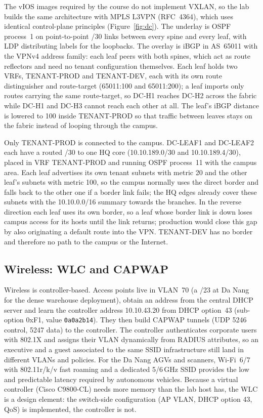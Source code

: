 \documentclass[11pt,a4paper]{article}
\begin{document}
The vIOS images required by the course do not implement VXLAN, so the lab builds the same architecture with MPLS L3VPN (RFC~4364), which uses identical control-plane principles (Figure~\ref{fig:dc}). The underlay is OSPF process~1 on point-to-point /30 links between every spine and every leaf, with LDP distributing labels for the loopbacks. The overlay is iBGP in AS~65011 with the VPNv4 address family: each leaf peers with both spines, which act as route reflectors and need no tenant configuration themselves. Each leaf holds two VRFs, TENANT-PROD and TENANT-DEV, each with its own route distinguisher and route-target (65011:100 and 65011:200); a leaf imports only routes carrying the same route-target, so DC-H1 reaches DC-H2 across the fabric while DC-H1 and DC-H3 cannot reach each other at all. The leaf's iBGP distance is lowered to 100 inside TENANT-PROD so that traffic between leaves stays on the fabric instead of looping through the campus.

Only TENANT-PROD is connected to the campus. DC-LEAF1 and DC-LEAF2 each have a routed /30 to one HQ core (10.10.189.0/30 and 10.10.189.4/30), placed in VRF TENANT-PROD and running OSPF process~11 with the campus area. Each leaf advertises its own tenant subnets with metric 20 and the other leaf's subnets with metric 100, so the campus normally uses the direct border and falls back to the other one if a border link fails; the HQ edges already cover these subnets with the 10.10.0.0/16 summary towards the branches. In the reverse direction each leaf uses its own border, so a leaf whose border link is down loses campus access for its hosts until the link returns; production would close this gap by also originating a default route into the VPN. TENANT-DEV has no border and therefore no path to the campus or the Internet.



\subsection{Wireless: WLC and CAPWAP}
\label{sec:wlan}

Wireless is controller-based. Access points live in VLAN~70 (a /23 at Da Nang for the dense warehouse deployment), obtain an address from the central DHCP server and learn the controller address 10.10.43.20 from DHCP option~43 (sub-option 0xF1, value \texttt{0a0a2b14}). They then build CAPWAP tunnels (UDP 5246 control, 5247 data) to the controller. The controller authenticates corporate users with 802.1X and assigns their VLAN dynamically from RADIUS attributes, so an executive and a guest associated to the same SSID infrastructure still land in different VLANs and policies. For the Da Nang AGVs and scanners, Wi-Fi~6/7 with 802.11r/k/v fast roaming and a dedicated 5/6\,GHz SSID provides the low and predictable latency required by autonomous vehicles. Because a virtual controller (Cisco C9800-CL) needs more memory than the lab host has, the WLC is a design element: the switch-side configuration (AP VLAN, DHCP option 43, QoS) is implemented, the controller is not.
\end{document}
